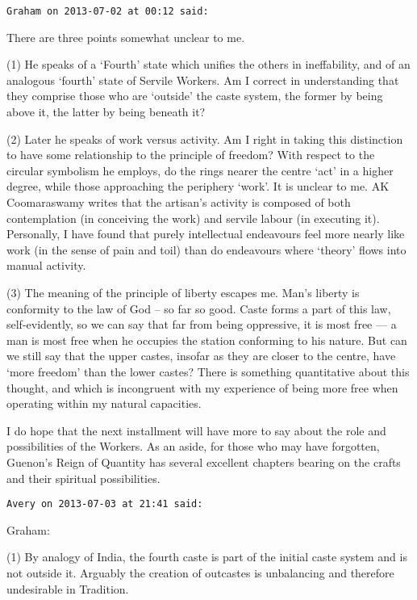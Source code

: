 \begin{footnotesize}\begin{sffamily}



\texttt{Graham on 2013-07-02 at 00:12 said: }

There are three points somewhat unclear to me. 

(1) He speaks of a `Fourth' state which unifies the others in ineffability, and of an analogous `fourth' state of Servile Workers. Am I correct in understanding that they comprise those who are `outside' the caste system, the former by being above it, the latter by being beneath it? 

(2) Later he speaks of work versus activity. Am I right in taking this distinction to have some relationship to the principle of freedom? With respect to the circular symbolism he employs, do the rings nearer the centre `act' in a higher degree, while those approaching the periphery `work'. It is unclear to me. AK Coomaraswamy writes that the artisan's activity is composed of both contemplation (in conceiving the work) and servile labour (in executing it). Personally, I have found that purely intellectual endeavours feel more nearly like work (in the sense of pain and toil) than do endeavours where `theory' flows into manual activity.

(3) The meaning of the principle of liberty escapes me. Man's liberty is conformity to the law of God – so far so good. Caste forms a part of this law, self-evidently, so we can say that far from being oppressive, it is most free — a man is most free when he occupies the station conforming to his nature. But can we still say that the upper castes, insofar as they are closer to the centre, have `more freedom' than the lower castes? There is something quantitative about this thought, and which is incongruent with my experience of being more free when operating within my natural capacities.

I do hope that the next installment will have more to say about the role and possibilities of the Workers. As an aside, for those who may have forgotten, Guenon's Reign of Quantity has several excellent chapters bearing on the crafts and their spiritual possibilities.


\hfill

\texttt{Avery on 2013-07-03 at 21:41 said: }

Graham:

(1) By analogy of India, the fourth caste is part of the initial caste system and is not outside it. Arguably the creation of outcastes is unbalancing and therefore undesirable in Tradition.


\end{sffamily}
\end{footnotesize}
